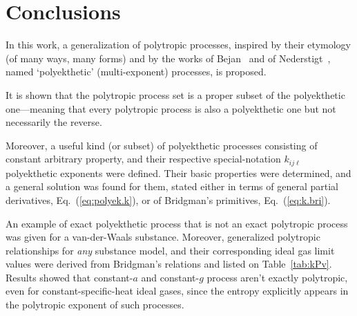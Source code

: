 \section{Conclusions}

    In this work, a generalization of polytropic processes, inspired by their etymology (of many
    ways,  many  forms)  and   by   the   works   of   Bejan~\cite{2006-BejanA-Wiley}   and   of
    Nederstigt~\cite{2017-NederstigtP-TUDelft}, named `polyekthetic' (multi-exponent) processes,
    is proposed.

    It is shown that the  polytropic  process  set  is  a  proper  subset  of  the  polyekthetic
    one---meaning that every polytropic process is also a polyekthetic one but  not  necessarily
    the reverse.

    Moreover, a useful kind  (or  subset)  of  polyekthetic  processes  consisting  of  constant
    arbitrary  property,  and  their  respective  special-notation   $k_{ij\ell}$   polyekthetic
    exponents were defined. Their basic properties were determined, and a general  solution  was
    found   for   them,   stated   either   in   terms   of   general    partial    derivatives,
    Eq.~(\ref{eq:polyek.k}), or of Bridgman's primitives, Eq.~(\ref{eq:k.bri}).

    An example of exact polyekthetic process that is not an exact polytropic process  was  given
    for a van-der-Waals substance. Moreover, generalized polytropic relationships for \emph{any}
    substance  model,  and  their  corresponding  ideal  gas  limit  values  were  derived  from
    Bridgman's relations and listed on Table~\ref{tab:kPv}. Results  showed  that  constant-$a$
    and constant-$g$ process aren't exactly polytropic, even  for  constant-specific-heat  ideal
    gases, since the entropy explicitly appears in the polytropic exponent of such processes.


